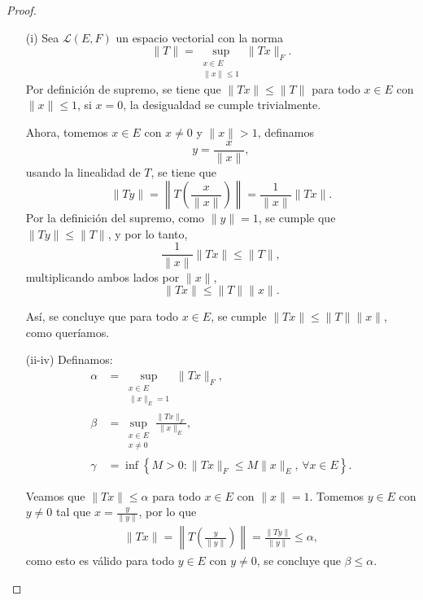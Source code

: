 \begin{proof}
\hfill
\begin{enumerate}



 \item[(i)]Sea \(\mathcal{L}(E, F)\) un espacio vectorial con la norma
\[
\|T\| = \sup_{\substack{x \in E \\ \| x\| \leq 1}}\|Tx\|_F.
\]
Por definición de supremo, se tiene que \(\|Tx\| \leq \|T\|\) para todo \(x \in E\) con \(\|x\| \leq 1\), si \(x = 0\), la desigualdad se cumple trivialmente. 

Ahora, tomemos \(x \in E\) con \(x \neq 0\) y $\|x\|>1$, definamos
\[
y = \frac{x}{\|x\|},
\]
 usando la linealidad de \(T\), se tiene que
\[
\|Ty\| = \left\|T\left(\frac{x}{\|x\|}\right)\right\| = \frac{1}{\|x\|} \|Tx\|.
\]
Por la definición del supremo, como \(\|y\| = 1\), se cumple que \(\|Ty\| \leq \|T\|\), y por lo tanto,
\[
\frac{1}{\|x\|} \|Tx\| \leq \|T\|,
\]
multiplicando ambos lados por \(\|x\|\),
\[
\|Tx\| \leq \|T\|\|x\|.
\]

Así, se concluye que para todo \(x \in E\), se cumple \(\|Tx\| \leq \|T\|\|x\|\), como queríamos.

\item[(ii-iv)] Definamos:
\begin{align*}
    \alpha &= \sup_{\substack{x\in E\\ \|x\|_E = 1}} \|T x\|_F,\\
    \beta &= \sup_{\substack{x \in E \\ x \neq 0}} \frac{\|T x\|_F}{\|x\|_E},\\
    \gamma &= \inf \left\{ M > 0 : \|T x\|_F \leq M \|x\|_E, \, \forall x \in E \right\}.
\end{align*}

Veamos que \(\|Tx\| \leq \alpha\) para todo \(x \in E\) con \(\|x\| = 1\).  
Tomemos \(y \in E\) con \(y \neq 0\) tal que \(x = \frac{y}{\|y\|}\), por lo que
\begin{align*}
    \|Tx\| = \left\|T\left(\frac{y}{\|y\|}\right)\right\| = \frac{\|Ty\|}{\|y\|} \leq \alpha,
\end{align*}
como esto es válido para todo \(y \in E\) con \(y \neq 0\), se concluye que \(\beta \leq \alpha\).


\end{enumerate}
\end{proof}
